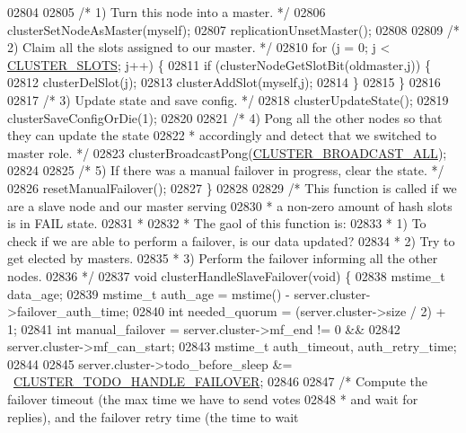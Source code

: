 \begin{DoxyCode}
{{{{{{{{{{{{{{{{{{{{{{{{{{{{{{{{{{{{{{{{{{{{{{{{{{{02804 
02805     \textcolor{comment}{/* 1) Turn this node into a master. */}
02806     clusterSetNodeAsMaster(myself);
02807     replicationUnsetMaster();
02808 
02809     \textcolor{comment}{/* 2) Claim all the slots assigned to our master. */}
02810     \textcolor{keywordflow}{for} (j = 0; j < \hyperlink{cluster_8h_aa3e2cb951eebb16725ecc3f5beefd9fd}{CLUSTER\_SLOTS}; j++) \{
02811         \textcolor{keywordflow}{if} (clusterNodeGetSlotBit(oldmaster,j)) \{
02812             clusterDelSlot(j);
02813             clusterAddSlot(myself,j);
02814         \}
02815     \}
02816 
02817     \textcolor{comment}{/* 3) Update state and save config. */}
02818     clusterUpdateState();
02819     clusterSaveConfigOrDie(1);
02820 
02821     \textcolor{comment}{/* 4) Pong all the other nodes so that they can update the state}
02822 \textcolor{comment}{     *    accordingly and detect that we switched to master role. */}
02823     clusterBroadcastPong(\hyperlink{cluster_8c_af8bfa0b87c4592863c3ece5242dc4dc4}{CLUSTER\_BROADCAST\_ALL});
02824 
02825     \textcolor{comment}{/* 5) If there was a manual failover in progress, clear the state. */}
02826     resetManualFailover();
02827 \}
02828 
02829 \textcolor{comment}{/* This function is called if we are a slave node and our master serving}
02830 \textcolor{comment}{ * a non-zero amount of hash slots is in FAIL state.}
02831 \textcolor{comment}{ *}
02832 \textcolor{comment}{ * The gaol of this function is:}
02833 \textcolor{comment}{ * 1) To check if we are able to perform a failover, is our data updated?}
02834 \textcolor{comment}{ * 2) Try to get elected by masters.}
02835 \textcolor{comment}{ * 3) Perform the failover informing all the other nodes.}
02836 \textcolor{comment}{ */}
02837 \textcolor{keywordtype}{void} clusterHandleSlaveFailover(\textcolor{keywordtype}{void}) \{
02838     mstime\_t data\_age;
02839     mstime\_t auth\_age = mstime() - server.cluster->failover\_auth\_time;
02840     \textcolor{keywordtype}{int} needed\_quorum = (server.cluster->size / 2) + 1;
02841     \textcolor{keywordtype}{int} manual\_failover = server.cluster->mf\_end != 0 &&
02842                           server.cluster->mf\_can\_start;
02843     mstime\_t auth\_timeout, auth\_retry\_time;
02844 
02845     server.cluster->todo\_before\_sleep &= ~\hyperlink{cluster_8h_afb969dfe84cf59e2340ed10cbf334a47}{CLUSTER\_TODO\_HANDLE\_FAILOVER};
02846 
02847     \textcolor{comment}{/* Compute the failover timeout (the max time we have to send votes}
02848 \textcolor{comment}{     * and wait for replies), and the failover retry time (the time to wait}
}}}}}}}}}}}}}}}}}}}}}}}}}}}}}}}}}}}}}}}}}}}}}}}}}}}
\end{DoxyCode}
